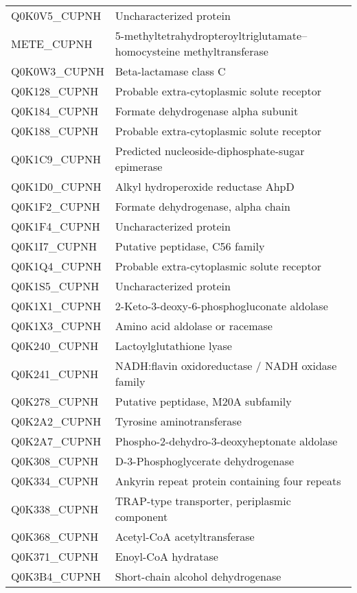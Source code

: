 \begin{center}
\begin{longtable}{ l l }
Q0K0V5\_CUPNH & Uncharacterized protein \\ [0.5ex]
METE\_CUPNH & 5-methyltetrahydropteroyltriglutamate--homocysteine methyltransferase \\ [0.5ex]
Q0K0W3\_CUPNH & Beta-lactamase class C \\ [0.5ex]
Q0K128\_CUPNH & Probable extra-cytoplasmic solute receptor \\ [0.5ex]
Q0K184\_CUPNH & Formate dehydrogenase alpha subunit \\ [0.5ex]
Q0K188\_CUPNH & Probable extra-cytoplasmic solute receptor \\ [0.5ex]
Q0K1C9\_CUPNH & Predicted nucleoside-diphosphate-sugar epimerase \\ [0.5ex]
Q0K1D0\_CUPNH & Alkyl hydroperoxide reductase AhpD \\ [0.5ex]
Q0K1F2\_CUPNH & Formate dehydrogenase, alpha chain \\ [0.5ex]
Q0K1F4\_CUPNH & Uncharacterized protein \\ [0.5ex]
Q0K1I7\_CUPNH & Putative peptidase, C56 family \\ [0.5ex]
Q0K1Q4\_CUPNH & Probable extra-cytoplasmic solute receptor \\ [0.5ex]
Q0K1S5\_CUPNH & Uncharacterized protein \\ [0.5ex]
Q0K1X1\_CUPNH & 2-Keto-3-deoxy-6-phosphogluconate aldolase \\ [0.5ex]
Q0K1X3\_CUPNH & Amino acid aldolase or racemase \\ [0.5ex]
Q0K240\_CUPNH & Lactoylglutathione lyase \\ [0.5ex]
Q0K241\_CUPNH & NADH:flavin oxidoreductase / NADH oxidase family \\ [0.5ex]
Q0K278\_CUPNH & Putative peptidase, M20A subfamily \\ [0.5ex]
Q0K2A2\_CUPNH & Tyrosine aminotransferase \\ [0.5ex]
Q0K2A7\_CUPNH & Phospho-2-dehydro-3-deoxyheptonate aldolase \\ [0.5ex]
Q0K308\_CUPNH & D-3-Phosphoglycerate dehydrogenase \\ [0.5ex]
Q0K334\_CUPNH & Ankyrin repeat protein containing four repeats \\ [0.5ex]
Q0K338\_CUPNH & TRAP-type transporter, periplasmic component \\ [0.5ex]
Q0K368\_CUPNH & Acetyl-CoA acetyltransferase \\ [0.5ex]
Q0K371\_CUPNH & Enoyl-CoA hydratase \\ [0.5ex]
Q0K3B4\_CUPNH & Short-chain alcohol dehydrogenase \\ [0.5ex]

\end{longtable}
\end{center}
